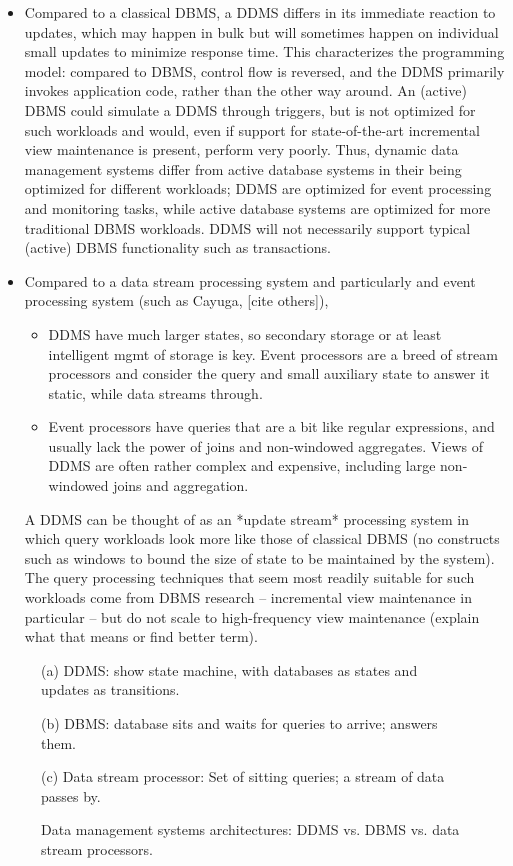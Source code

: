 \begin{itemize}
\item
Compared to a classical DBMS, a DDMS differs in its immediate reaction to updates, which may happen in bulk but will sometimes happen on individual small updates to minimize response time. This characterizes the programming model: compared to DBMS, control flow is reversed, and the DDMS primarily invokes application code, rather than the other way around. An (active) DBMS could simulate a DDMS through triggers, but is not optimized for such workloads and would, even if support for state-of-the-art incremental view maintenance is present, perform very poorly. Thus, dynamic data management systems differ from active database systems in their being optimized for different workloads; DDMS are optimized for event processing and monitoring tasks, while active database systems are optimized for more traditional DBMS workloads. DDMS will not necessarily support typical (active) DBMS functionality such as transactions.

\item
Compared to a data stream processing system and particularly and event processing system (such as Cayuga, [cite others]),
   \begin{itemize}
   \item DDMS have much larger states, so secondary storage or at least intelligent mgmt of storage is key. Event processors are a breed of stream processors and consider the query and small auxiliary state to answer it static, while data streams through.
    \item Event processors have queries that are a bit like regular expressions, and usually lack the power of joins and non-windowed aggregates. Views of DDMS are often rather complex and expensive, including large non-windowed joins and aggregation.
    \end{itemize}

A DDMS can be thought of as an *update stream* processing system in which query workloads look more like those of classical DBMS (no constructs such as windows to bound the size of state to be maintained by the system). The query processing techniques that seem most readily suitable for such workloads come from DBMS research -- incremental view maintenance in particular -- but do not scale to high-frequency view maintenance (explain what that means or find better term).
\end{itemize}


\begin{figure}
(a) DDMS: show state machine, with databases as states and updates as transitions.

(b) DBMS: database sits and waits for queries to arrive; answers them.

(c) Data stream processor: Set of sitting queries; a stream of data passes by.

\caption{Data management systems architectures: DDMS vs. DBMS vs. data stream processors.}
\end{figure}


